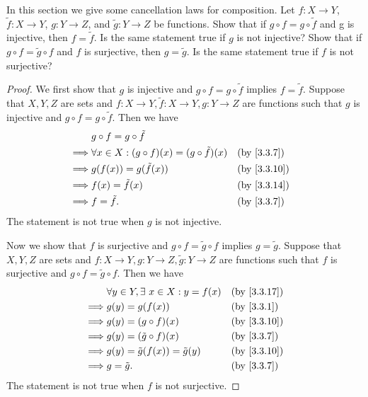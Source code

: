 \begin{ex}\label{ex:3.3.4}
  In this section we give some cancellation laws for composition.
  Let \(f : X \to Y\), \(\tilde{f} : X \to Y\), \(g : Y \to Z\), and \(\tilde{g} : Y \to Z\) be functions.
  Show that if \(g \circ f = g \circ \tilde{f}\) and g is injective, then \(f = \tilde{f}\).
  Is the same statement true if \(g\) is not injective?
  Show that if \(g \circ f = \tilde{g} \circ f\) and \(f\) is surjective, then \(g = \tilde{g}\).
  Is the same statement true if \(f\) is not surjective?
\end{ex}

\begin{proof}
  We first show that \(g\) is injective and \(g \circ f = g \circ \tilde{f}\) implies \(f = \tilde{f}\).
  Suppose that \(X, Y, Z\) are sets and \(f : X \to Y, \tilde{f} : X \to Y, g : Y \to Z\) are functions such that \(g\) is injective and \(g \circ f = g \circ \tilde{f}\).
  Then we have
  \begin{align*}
             & g \circ f = g \circ \tilde{f}                                                            \\
    \implies & \forall x \in X : (g \circ f)(x) = (g \circ \tilde{f})(x) &  & \by{3.3.7}                \\
    \implies & g(f(x)) = g(\tilde{f}(x))                                 &  & \text{(by \cref{3.3.10})} \\
    \implies & f(x) = \tilde{f}(x)                                       &  & \text{(by \cref{3.3.14})} \\
    \implies & f = \tilde{f}.                                            &  & \by{3.3.7}
  \end{align*}
  The statement is not true when \(g\) is not injective.

  Now we show that \(f\) is surjective and \(g \circ f = \tilde{g} \circ f\) implies \(g = \tilde{g}\).
  Suppose that \(X, Y, Z\) are sets and \(f : X \to Y, g : Y \to Z, \tilde{g} : Y \to Z\) are functions such that \(f\) is surjective and \(g \circ f = \tilde{g} \circ f\).
  Then we have
  \begin{align*}
             & \forall y \in Y, \exists\ x \in X : y = f(x) &  & \text{(by \cref{3.3.17})} \\
    \implies & g(y) = g(f(x))                               &  & \by{3.3.1}                \\
    \implies & g(y) = (g \circ f)(x)                        &  & \text{(by \cref{3.3.10})} \\
    \implies & g(y) = (\tilde{g} \circ f)(x)                &  & \by{3.3.7}                \\
    \implies & g(y) = \tilde{g}(f(x)) = \tilde{g}(y)        &  & \text{(by \cref{3.3.10})} \\
    \implies & g = \tilde{g}.                               &  & \by{3.3.7}
  \end{align*}
  The statement is not true when \(f\) is not surjective.
\end{proof}

